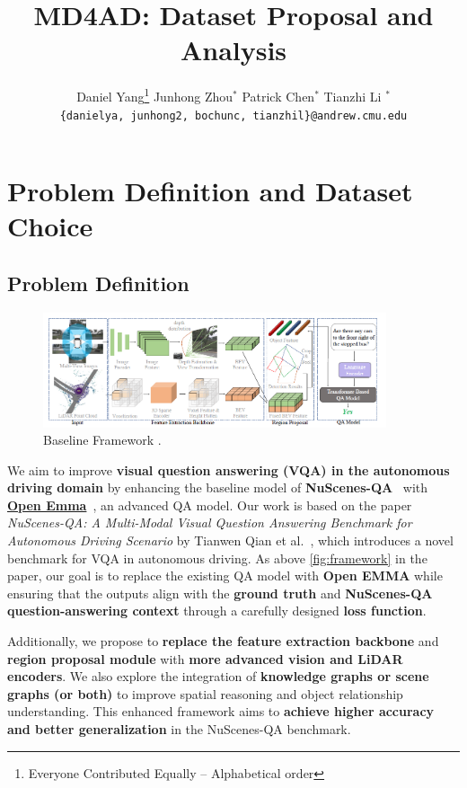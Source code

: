 \documentclass{article} %
\title{MD4AD: Dataset Proposal and Analysis}
\author{
	Daniel Yang\thanks{\hspace{4pt}Everyone Contributed Equally -- Alphabetical order} \hspace{2em} Junhong Zhou$^*$ \hspace{2em} Patrick Chen$^*$ \hspace{2em} Tianzhi Li $^*$ \\
	\texttt{\{danielya, junhong2, bochunc, tianzhil\}@andrew.cmu.edu}
}
\date{}
\begin{document}
	\maketitle
	
	\section{ Problem Definition and Dataset Choice}
	
	\subsection*{Problem Definition}
	\begin{figure}[H]
		\centering
		\includegraphics[width=0.9\textwidth]{./Figures/Baseline_Framework.png}
		\caption{Baseline Framework \cite{qian2024nuscenes}.}
		\label{fig:framework}
	\end{figure}
	
	We aim to improve \textbf{visual question answering (VQA) in the autonomous driving domain} by enhancing the baseline model of \textbf{NuScenes-QA}~\cite{qian2024nuscenes} with \href{https://github.com/taco-group/OpenEMMA}{\textbf{Open Emma}}~\cite{openemma}, an advanced QA model. Our work is based on the paper \textit{NuScenes-QA: A Multi-Modal Visual Question Answering Benchmark for Autonomous Driving Scenario} by Tianwen Qian et al.~\cite{qian2024nuscenes}, which introduces a novel benchmark for VQA in autonomous driving. As above \autoref{fig:framework} in the paper, our goal is to replace the existing QA model with \textbf{Open EMMA} while ensuring that the outputs align with the \textbf{ground truth} and \textbf{NuScenes-QA question-answering context} through a carefully designed \textbf{loss function}.
	
	Additionally, we propose to \textbf{replace the feature extraction backbone} and \textbf{region proposal module} with \textbf{more advanced vision and LiDAR encoders}. We also explore the integration of \textbf{knowledge graphs or scene graphs (or both)} to improve spatial reasoning and object relationship understanding. This enhanced framework aims to \textbf{achieve higher accuracy and better generalization} in the NuScenes-QA benchmark.
	
\end{document}
